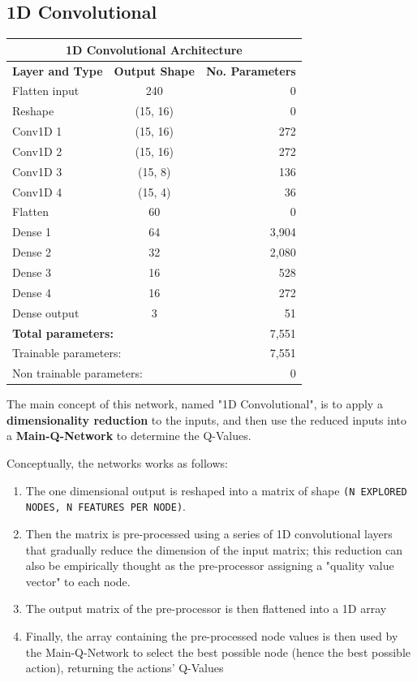 \documentclass[13pt]{article}
\begin{document}
\subsection{1D Convolutional}
\begin{center}
    \begin{tabular}{| l | c | r |}
        \hline
        \multicolumn{3}{|c|}{\textbf{1D Convolutional Architecture}} \\
        \hline
        \hline
        \textbf{Layer and Type} & \textbf{Output Shape} & \textbf{No. Parameters} \\
        \hline
        Flatten input & 240 & 0 \\
        Reshape & (15, 16) & 0 \\
        Conv1D 1 & (15, 16) & 272 \\
        Conv1D 2 & (15, 16) & 272 \\
        Conv1D 3 & (15, 8) & 136 \\
        Conv1D 4 & (15, 4) & 36 \\
        Flatten & 60 & 0 \\
        Dense 1 & 64 & 3,904 \\
        Dense 2 & 32 & 2,080 \\
        Dense 3 & 16 & 528 \\
        Dense 4 & 16 & 272 \\
        Dense output & 3 & 51 \\
        \hline
        \multicolumn{2}{|l|}{\textbf{Total parameters:}} & 7,551 \\
        \multicolumn{2}{|l|}{Trainable parameters:} & 7,551 \\
        \multicolumn{2}{|l|}{Non trainable parameters:} & 0 \\
        \hline
    \end{tabular}
\end{center}

The main concept of this network, named "1D Convolutional", is to apply a \textbf{dimensionality reduction} to the inputs, and then use the reduced inputs into a \textbf{Main-Q-Network} to determine the Q-Values.

Conceptually, the networks works as follows:
\begin{enumerate}
    \item The one dimensional output is reshaped into a matrix of shape \texttt{(N EXPLORED NODES, N FEATURES PER NODE)}.
    \item Then the matrix is pre-processed using a series of 1D convolutional layers that gradually reduce the dimension of the input matrix; this reduction can also be empirically thought as the pre-processor assigning a "quality value vector" to each node.
    \item The output matrix of the pre-processor is then flattened into a 1D array
    \item Finally, the array containing the pre-processed node values is then used by the Main-Q-Network to select the best possible node (hence the best possible action), returning the actions' Q-Values
\end{enumerate}
\end{document}
